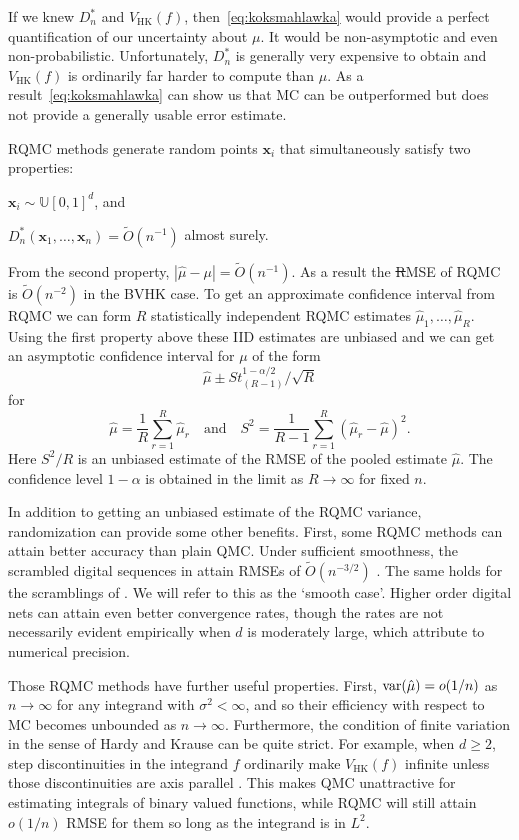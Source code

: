 \documentclass{article}
\newcommand{\fred}[1]{\begingroup\color{red}#1\endgroup}
\renewcommand{\ge}{\geqslant}
\newcommand{\bsx}{\boldsymbol{x}}
\newcommand{\dunif}{\mathbb{U}}
\newcommand{\hk}{\mathrm{HK}}
\begin{document}
If we knew $D_n^*$ and $V_\hk(f)$, then~\eqref{eq:koksmahlawka} would provide a
perfect quantification of our uncertainty about $\mu$.
It would be non-asymptotic and even non-probabilistic.
Unfortunately, $D_n^*$ is generally very expensive
to obtain and $V_{\hk}(f)$ is ordinarily far harder
to compute than $\mu$. As a result~\eqref{eq:koksmahlawka}
can show us that MC can be outperformed but does
not provide a generally usable error estimate.

RQMC methods generate random points $\bsx_i$ that
simultaneously satisfy two properties:
\begin{compactenum}[\quad\bf1)]
\item $\bsx_i\sim\dunif[0,1]^d$, and
\item $D_n^*(\bsx_1,\dots,\bsx_n)=\tilde O(n^{-1})$ almost surely.
\end{compactenum}

From the second property, $|\hat\mu-\mu|=\tilde O(n^{-1})$.
As a result the \fred{\sout{R}}MSE of RQMC is $\tilde O(n^{-2})$
in the BVHK case.
To get an approximate confidence interval from RQMC
we can form $R$ statistically independent RQMC estimates
$\hat\mu_1,\dots,\hat\mu_R$. Using the first property
above these IID estimates are unbiased and we can get
an asymptotic confidence interval for $\mu$ of the form
$$
\hat\mu \pm S t_{(R-1)}^{1-\alpha/2}/\sqrt{R}
$$
for
$$
\hat\mu = \frac1R\sum_{r=1}^R\hat\mu_r
\quad\text{and}\quad
S^2 = \frac1{R-1}\sum_{r=1}^R(\hat\mu_r-\hat\mu)^2.
$$
Here $S^2/R$ is an unbiased estimate of the RMSE
of the pooled estimate $\hat\mu$.
The confidence level $1-\alpha$ is obtained in
the limit as $R\to\infty$ \cite{naka:tuff:2024}
for fixed $n$.

In addition to getting an unbiased estimate of
the RQMC variance, randomization can provide
some other benefits.  First, some RQMC methods
can attain better accuracy than plain QMC.
Under sufficient smoothness, the scrambled  digital sequences
in \cite{Owe95} attain RMSEs of $\tilde O(n^{-3/2})$
\cite{Owe97,Owe08a}. The same holds for the scramblings
of \cite{Mat98}. We will refer to this as the `smooth case'.
Higher order digital nets \cite{Dic11a} can attain even
better convergence rates, though the rates are not
necessarily evident empirically when $d$ is moderately
large, which \cite{nuyens2010higher} attribute to numerical precision.

Those RQMC methods have further
useful properties.  First,  $\operatorname{var}(\hat\mu) = o(1/n)$ as $n\to\infty$
for any integrand with $\sigma^2<\infty$, and so their
efficiency with respect to MC becomes unbounded as $n\to\infty$.
Furthermore, the condition of finite
variation in the sense of Hardy and Krause can be quite
strict. For example, when $d\ge2$, step discontinuities in the integrand
$f$ ordinarily make $V_{\hk}(f)$ infinite unless those discontinuities
are axis parallel \cite{Owe05a}. This makes QMC
unattractive for estimating integrals of binary
valued functions, while RQMC will still attain
$o(1/n)$ RMSE for them so long as the integrand
is in $L^2$.
\end{document}
